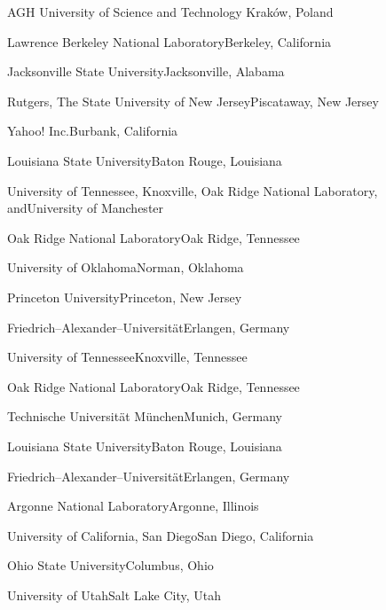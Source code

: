 \begin{multicols}{2}
 {AGH University of Science and Technology}{
Krak{\'o}w, Poland}\vspace*{5pt}


 {Lawrence Berkeley National
Laboratory}{Berkeley, California}

 {Jacksonville State University}{Jacksonville,
Alabama}

 {Rutgers, The State University of New
Jersey}{Piscataway, New Jersey}

 {Yahoo! Inc.}{Burbank, California}

{Louisiana State University}{Baton Rouge, Louisiana}

 {University of Tennessee, Knoxville, 
Oak Ridge National Laboratory, and}{University of Manchester}

 {Oak Ridge National Laboratory}{Oak Ridge,
Tennessee}

 {University of Oklahoma}{Norman,
Oklahoma}

 {Princeton University}{Princeton, New
Jersey}

{Friedrich--Alexander--Universit{\"a}t}{Erlangen, Germany}

 {University of Tennessee}{Knoxville,
Tennessee}

 {Oak Ridge National Laboratory}{Oak Ridge,
Tennessee}

 {Technische Universit{\"a}t
M{\"u}nchen}{Munich, Germany}

{Louisiana State University}{Baton Rouge, Louisiana}

{Friedrich--Alexander--Universit{\"a}t}{Erlangen, Germany}

 {Argonne National Laboratory}{Argonne,
Illinois}

 {University of California, San
Diego}{San Diego, California}

 {Ohio State University}{Columbus, Ohio}

 {University of Utah}{Salt Lake City,
Utah}


\end{multicols}
